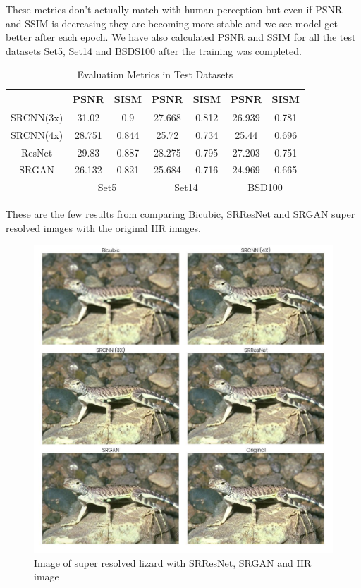     These metrics don't actually match with human perception but even if PSNR and SSIM is decreasing they are becoming more stable and we see model get better after each epoch.
    We have also calculated PSNR and SSIM for all the test datasets Set5, Set14 and BSDS100 after the training was completed.
\begin{table}[h]
    \centering
    \begin{tabular}{|c|c|c|c|c|c|c|}
    \hline
    &PSNR & SISM & PSNR & SISM & PSNR & SISM \\
    \hline
    SRCNN(3x)&31.02 & 0.9 & 27.668 & 0.812 & 26.939 & 0.781 \\
    \hline
    SRCNN(4x)&28.751 & 0.844 & 25.72 & 0.734 & 25.44 & 0.696 \\
    \hline
    ResNet&29.83 & 0.887 & 28.275 & 0.795 & 27.203 & 0.751 \\
    \hline
    SRGAN &26.132 & 0.821 &25.684 & 0.716 & 24.969 & 0.665 \\
    \hline
    & \multicolumn{2}{|c|}{Set5}& \multicolumn{2}{|c|}{Set14} & \multicolumn{2}{|c|}{BSD100} \\
    \hline
    \end{tabular}
    \caption{Evaluation Metrics in Test Datasets}
\end{table}
\clearpage
\newpage
    These are the few results from comparing Bicubic, SRResNet and SRGAN super resolved images with the original HR images.
    \begin{figure}[t]
        \centering
        \includegraphics[width=5.5in]{./figures/examples/lizard.jpg}
        \caption{Image of super resolved lizard with SRResNet, SRGAN and HR image}
    \end{figure}
